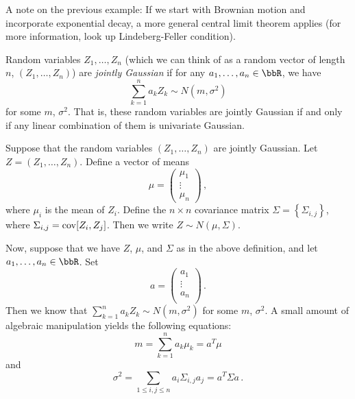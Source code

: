 \documentclass[../../../Master/AppliedStochastics.tex]{subfiles}
\author{Maya}
\date{26 September 2018}
\begin{document}
%


\makelecture


A note on the previous example:
    If we start with Brownian motion and incorporate exponential decay,
        a more general central limit theorem applies
    (for more information, look up Lindeberg-Feller condition).


\begin{definition}
    Random variables $Z_1, \dots, Z_n$
        (which we can think of as a random vector of length $n$,
            $(Z_1, \dots, Z_n)$)
    are \emph{jointly Gaussian} if for any $a_1, \dots, a_n \in \bbR$,
    we have
    \begin{equation*}
        \sum_{k = 1}^n a_k Z_k \sim N(m, \sigma^2)
    \end{equation*}
        for some $m$, $\sigma^2$.
    That is, these random variables are jointly Gaussian if and only if
        any linear combination of them is univariate Gaussian.
\end{definition}


\begin{definition}
Suppose that the random variables $(Z_1, \dots, Z_n)$ are jointly Gaussian.
Let $Z=(Z_1, \dots, Z_n)$.
Define a vector of means
\begin{equation*}
    \mu = \left(\begin{array}{ccc}
            \mu_1 \\ \vdots \\ \mu_n
          \end{array}
          \right)\,,
\end{equation*}
    where $\mu_i$ is the mean of $Z_i$.
Define the $n \times n$ covariance matrix
    $\Sigma = \left\{\Sigma_{i, j}\right\}$,
    where $\Sigma_{i, j} = \operatorname{cov}[Z_i, Z_j]$.
Then we write $Z \sim N(\mu, \Sigma)$.
\end{definition}


Now, suppose that we have $Z$, $\mu$, and $\Sigma$ as in the above definition,
    and let $a_1, \dots, a_n \in \bbR$.
Set
\begin{equation*}
    a = \left(\begin{array}{c}
            a_1\\ \vdots\\ a_n\\
        \end{array}\right)\,.
\end{equation*}
Then we know that $\displaystyle\sum_{k = 1}^n a_k Z_k \sim N(m, \sigma^2)$
    for some $m$, $\sigma^2$.
A small amount of algebraic manipulation yields the following equations:
\begin{equation*}
    m = \sum_{k = 1}^n a_k \mu_k = a^T \mu
\end{equation*}
    and
\begin{equation*}
    \sigma^2 = \sum_{1\leq i, j\leq n} a_i \Sigma_{i, j} a_j = a^T \Sigma a\,.
\end{equation*}
\end{document}
